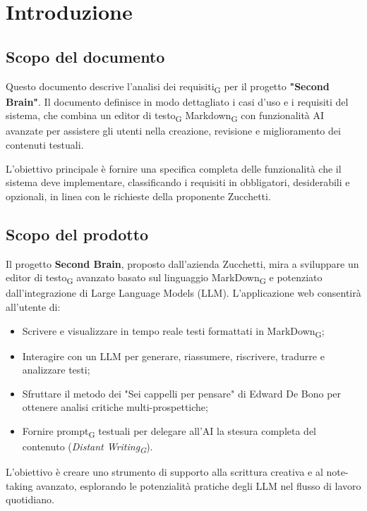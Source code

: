 \documentclass[11pt,a4paper]{article}
\newcommand{\gls}[1]{#1\textsubscript{G}}
\begin{document}
\newpage

\tableofcontents
\thispagestyle{empty}
\newpage

\setcounter{page}{1}

\section{Introduzione}
\subsection{Scopo del documento}
Questo documento descrive l'\gls{analisi dei requisiti} per il progetto \textbf{"Second Brain"}. Il documento definisce in modo dettagliato i casi d'uso e i requisiti del sistema, che combina un \gls{editor di testo} \gls{Markdown} con funzionalità AI avanzate per assistere gli utenti nella creazione, revisione e miglioramento dei contenuti testuali.

L'obiettivo principale è fornire una specifica completa delle funzionalità che il sistema deve implementare, classificando i requisiti in obbligatori, desiderabili e opzionali, in linea con le richieste della proponente Zucchetti.

\subsection{Scopo del prodotto}
Il progetto \textbf{Second Brain}, proposto dall'azienda Zucchetti, mira a sviluppare un \gls{editor di testo} avanzato basato sul linguaggio \gls{MarkDown} e potenziato dall'integrazione di Large Language Models (LLM).
L'applicazione web consentirà all'utente di:
\begin{itemize}
    \item Scrivere e visualizzare in tempo reale testi formattati in \gls{MarkDown};
    \item Interagire con un LLM per generare, riassumere, riscrivere, tradurre e analizzare testi;
    \item Sfruttare il metodo dei "Sei cappelli per pensare" di Edward De Bono per ottenere analisi critiche multi-prospettiche;
    \item Fornire \gls{prompt} testuali per delegare all'AI la stesura completa del contenuto (\textit{\gls{Distant Writing}}).
\end{itemize}
L'obiettivo è creare uno strumento di supporto alla scrittura creativa e al note-taking avanzato, esplorando le potenzialità pratiche degli LLM nel flusso di lavoro quotidiano.
\end{document}
